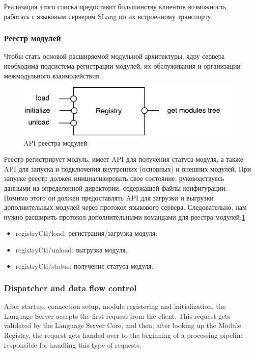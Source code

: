 Реализация этого списка предоставит большинству клиентов возможность работать с языковым сервером SLang по их встроенному транспорту.

\subsubsection{Реестр модулей}
\label{sec:met:arch:core:module_registry}

Чтобы стать основой расширяемой модульной архитектуры, ядру сервера необходима подсистема регистрации модулей, их обслуживания и организации межмодульного взаимодействия.

\begin{figure}[H]
    \centering
    \includegraphics[width=.7\textwidth]{figs/registry.pdf}
    \caption{API реестра модулей}
    \label{fig:met:registry_methods}
\end{figure}

\newpage

Реестр регистрирует модуль, имеет API для получения статуса модуля, а также API для запуска и подключения внутренних (основных) и внешних модулей. 
При запуске реестр должен инициализировать свое состояние, руководствуясь данными из определенной директории, содержащей файлы конфигурации. 
Помимо этого он должен предоставлять API для загрузки и выгрузки дополнительных модулей через протокол языкового сервера. 
Следовательно, нам нужно расширить протокол дополнительными командами для реестра модулей:\ref{fig:met:registry_methods}
\begin{itemize}
    \item registryCtl/load: регистрация/загрузка модуля.
    \item registryCtl/unload: выгрузка модуля.
    \item registryCtl/status: получение статуса модуля.
\end{itemize}

\subsubsection{Dispatcher and data flow control}
\label{sec:met:arch:core:dispatcher}

After startup, connection setup, module registering and initialization,
the Language Server accepts the first request from the client.
This request gets validated by the Language Server Core, and then, after looking up the Module Registry, the request
gets handed over to the beginning of a processing pipeline responsible for handling this type of requests.

